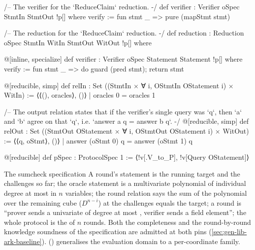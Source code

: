 \begin{leancode}
/-- The verifier for the `ReduceClaim` reduction. -/
def verifier : Verifier oSpec StmtIn StmtOut !p[] where
  verify := fun stmt _ => pure (mapStmt stmt)

/-- The reduction for the `ReduceClaim` reduction. -/
def reduction : Reduction oSpec StmtIn WitIn StmtOut WitOut !p[] where
\end{leancode}



\begin{leancode}
@[inline, specialize]
def verifier : Verifier oSpec Statement Statement !p[] where
  verify := fun stmt _ => do guard (pred stmt); return stmt
\end{leancode}



\begin{leancode}
@[reducible, simp]
def relIn : Set ((StmtIn × ∀ i, OStmtIn OStatement i) × WitIn) :=
  { ⟨⟨(), oracles⟩, ()⟩ | oracles 0 = oracles 1 }

/--
The output relation states that if the verifier's single query was `q`, then
`a` and `b` agree on that `q`, i.e. `answer a q = answer b q`.
-/
@[reducible, simp]
def relOut : Set ((StmtOut OStatement × ∀ i, OStmtOut OStatement i) × WitOut) :=
  { ⟨⟨q, oStmt⟩, ()⟩ | answer (oStmt 0) q = answer (oStmt 1) q }

@[reducible]
def pSpec : ProtocolSpec 1 := ⟨!v[.V_to_P], !v[Query OStatement]⟩
\end{leancode}


\begin{define}{The sumcheck specification}
A round's statement is the running target and the challenges so far; the oracle statement is a
multivariate polynomial of individual degree at most  in $n$ variables; the round
relation says the sum of the polynomial over the remaining cube ($D^{n-i}$) at the challenges
equals the target; a round is \enquote{prover sends a univariate of degree at most ,
verifier sends a field element}; the whole protocol is the  of $n$ rounds. Both
the completeness and the round-by-round knowledge soundness of the specification are admitted at
both pins (\cref{sec:gen-lib-ark-baseline}).  ()
generalises the evaluation domain to a per-coordinate family.
\end{define}

